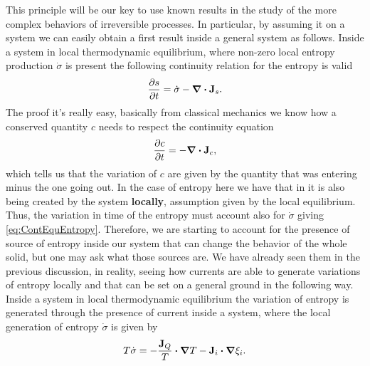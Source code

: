 This principle will be our key to use known results in the study of the more complex behaviors of irreversible processes. In particular, by assuming it on a system we can easily obtain a first result inside a general system as follows.
{
    Inside a system in local thermodynamic equilibrium, where non-zero local entropy production $\dot{\sigma}$ is present the following continuity relation for the entropy is valid
    \begin{equation}
        \label{eq:ContEquEntropy}
        \pdv{s}{t} = \dot{\sigma} - \grad\vdot\vb{J}_s.
    \end{equation}
}
{
    The proof it's really easy, basically from classical mechanics we know how a conserved quantity $c$ needs to respect the continuity equation
    \begin{equation}
        \pdv{c}{t} = - \grad\vdot\vb{J}_c,
    \end{equation}
    which tells us that the variation of $c$ are given by the quantity that was entering minus the one going out. In the case of entropy here we have that in it is also being created by the system \textbf{locally}, assumption given by the local equilibrium. Thus, the variation in time of the entropy must account also for $\dot{\sigma}$ giving \eqref{eq:ContEquEntropy}.
}
\noindent
Therefore, we are starting to account for the presence of source of entropy inside our system that can change the behavior of the whole solid, but one may ask what those sources are. We have already seen them in the previous discussion, in reality, seeing how currents are able to generate variations of entropy locally and that can be set on a general ground in the following way.
{
    Inside a system in local thermodynamic equilibrium the variation of entropy is generated through the presence of current inside a system, where the local generation of entropy $\dot{\sigma}$ is given by
    \begin{equation}
        T\dot{\sigma} = -\frac{\vb{J}_Q}{T}\vdot\grad T - \vb{J}_i\vdot\grad\xi_i.
    \end{equation}
}
